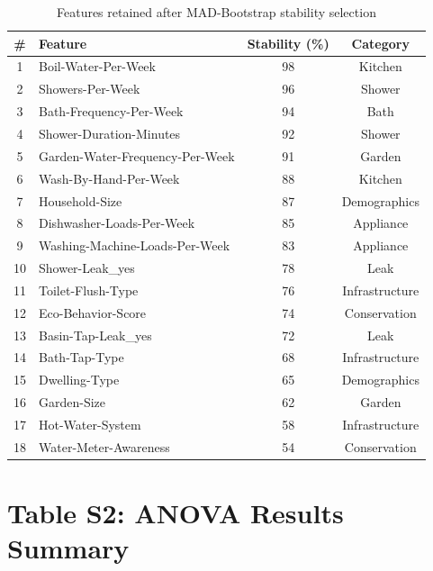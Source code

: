 \documentclass[a4paper,12pt]{article}
\begin{document}
\begin{table}[htbp]
    \centering
    \caption{Features retained after MAD-Bootstrap stability selection}
    \begin{tabular}{clcc}
        \toprule
        \# & Feature & Stability (\%) & Category \\
        \midrule
        1 & Boil-Water-Per-Week & 98 & Kitchen \\
        2 & Showers-Per-Week & 96 & Shower \\
        3 & Bath-Frequency-Per-Week & 94 & Bath \\
        4 & Shower-Duration-Minutes & 92 & Shower \\
        5 & Garden-Water-Frequency-Per-Week & 91 & Garden \\
        6 & Wash-By-Hand-Per-Week & 88 & Kitchen \\
        7 & Household-Size & 87 & Demographics \\
        8 & Dishwasher-Loads-Per-Week & 85 & Appliance \\
        9 & Washing-Machine-Loads-Per-Week & 83 & Appliance \\
        10 & Shower-Leak\_yes & 78 & Leak \\
        11 & Toilet-Flush-Type & 76 & Infrastructure \\
        12 & Eco-Behavior-Score & 74 & Conservation \\
        13 & Basin-Tap-Leak\_yes & 72 & Leak \\
        14 & Bath-Tap-Type & 68 & Infrastructure \\
        15 & Dwelling-Type & 65 & Demographics \\
        16 & Garden-Size & 62 & Garden \\
        17 & Hot-Water-System & 58 & Infrastructure \\
        18 & Water-Meter-Awareness & 54 & Conservation \\
        \bottomrule
    \end{tabular}
\end{table}

\newpage
\section{Table S2: ANOVA Results Summary}
\end{document}
